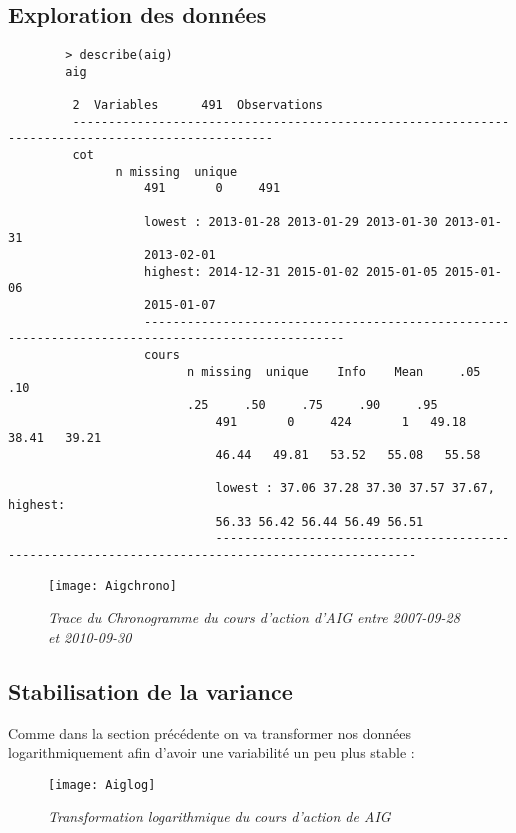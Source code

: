     \subsection{Exploration des données}
        \begin{verbatim}    
        > describe(aig)
        aig 

         2  Variables      491  Observations
         --------------------------------------------------------------------------------------------------
         cot 
               n missing  unique 
                   491       0     491 

                   lowest : 2013-01-28 2013-01-29 2013-01-30 2013-01-31
                   2013-02-01
                   highest: 2014-12-31 2015-01-02 2015-01-05 2015-01-06
                   2015-01-07 
                   --------------------------------------------------------------------------------------------------
                   cours 
                         n missing  unique    Info    Mean     .05     .10
                         .25     .50     .75     .90     .95 
                             491       0     424       1   49.18   38.41   39.21
                             46.44   49.81   53.52   55.08   55.58 

                             lowest : 37.06 37.28 37.30 37.57 37.67, highest:
                             56.33 56.42 56.44 56.49 56.51 
                             --------------------------------------------------------------------------------------------------
        \end{verbatim}
        \begin{figure}[H]
            \centering 
           \label{fig:Aigchrono} 
            \texttt{[image: Aigchrono]} 
            \caption{\it Trace du Chronogramme du cours d'action d'AIG entre
            2007-09-28 et 2010-09-30} 
        \end{figure} 

    \subsection{Stabilisation de la variance}                

        Comme dans la section précédente on va transformer nos données
        logarithmiquement afin d'avoir une variabilité un peu plus
        stable :
        \begin{figure}[H]
            \centering 
            \label{fig:Aiglog} 
            \texttt{[image: Aiglog]} 
            \caption{\it Transformation logarithmique du cours
            d'action de AIG } 
        \end{figure} 

